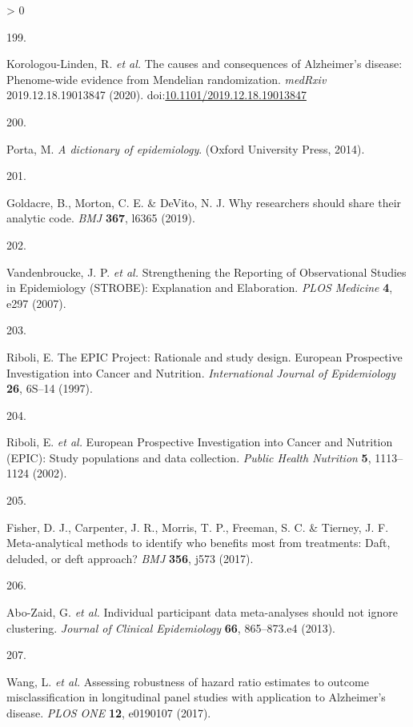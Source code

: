 \documentclass[a4paper, twoside]{templates/ociamthesis}
\newlength{\cslhangindent}
\newlength{\csllabelwidth}
\newenvironment{CSLReferences}[3] %
 {%
  \setlength{\parindent}{0pt}
  \ifodd #1 \everypar{\setlength{\hangindent}{\cslhangindent}}\ignorespaces\fi
  \ifnum #2 > 0
  \setlength{\parskip}{#2\baselineskip}
  \fi
 }%
 {}
\newcommand{\CSLLeftMargin}[1]{\parbox[t]{\maxof{\widthof{#1}}{\csllabelwidth}}{#1}}
\newcommand{\CSLRightInline}[1]{\parbox[t]{\linewidth - \csllabelwidth}{#1}}
\begin{document}
\begin{CSLReferences}{0}{0}
\leavevmode\hypertarget{ref-korologou-linden2020}{}%
\CSLLeftMargin{199. }
\CSLRightInline{Korologou-Linden, R. \emph{et al.} The causes and consequences of {Alzheimer}'s disease: Phenome-wide evidence from {Mendelian} randomization. \emph{medRxiv} 2019.12.18.19013847 (2020). doi:\href{https://doi.org/10.1101/2019.12.18.19013847}{10.1101/2019.12.18.19013847}}

\leavevmode\hypertarget{ref-porta2014dictionary}{}%
\CSLLeftMargin{200. }
\CSLRightInline{Porta, M. \emph{A dictionary of epidemiology}. ({Oxford University Press}, 2014).}

\leavevmode\hypertarget{ref-goldacre2019c}{}%
\CSLLeftMargin{201. }
\CSLRightInline{Goldacre, B., Morton, C. E. \& DeVito, N. J. Why researchers should share their analytic code. \emph{BMJ} \textbf{367}, l6365 (2019).}

\leavevmode\hypertarget{ref-vandenbroucke2007}{}%
\CSLLeftMargin{202. }
\CSLRightInline{Vandenbroucke, J. P. \emph{et al.} Strengthening the {Reporting} of {Observational Studies} in {Epidemiology} ({STROBE}): {Explanation} and {Elaboration}. \emph{PLOS Medicine} \textbf{4}, e297 (2007).}

\leavevmode\hypertarget{ref-riboli1997}{}%
\CSLLeftMargin{203. }
\CSLRightInline{Riboli, E. The {EPIC Project}: Rationale and study design. {European Prospective Investigation} into {Cancer} and {Nutrition}. \emph{International Journal of Epidemiology} \textbf{26}, 6S--14 (1997).}

\leavevmode\hypertarget{ref-riboli2002}{}%
\CSLLeftMargin{204. }
\CSLRightInline{Riboli, E. \emph{et al.} European {Prospective Investigation} into {Cancer} and {Nutrition} ({EPIC}): Study populations and data collection. \emph{Public Health Nutrition} \textbf{5}, 1113--1124 (2002).}

\leavevmode\hypertarget{ref-fisher2017}{}%
\CSLLeftMargin{205. }
\CSLRightInline{Fisher, D. J., Carpenter, J. R., Morris, T. P., Freeman, S. C. \& Tierney, J. F. Meta-analytical methods to identify who benefits most from treatments: Daft, deluded, or deft approach? \emph{BMJ} \textbf{356}, j573 (2017).}

\leavevmode\hypertarget{ref-abo-zaid2013}{}%
\CSLLeftMargin{206. }
\CSLRightInline{Abo-Zaid, G. \emph{et al.} Individual participant data meta-analyses should not ignore clustering. \emph{Journal of Clinical Epidemiology} \textbf{66}, 865--873.e4 (2013).}

\leavevmode\hypertarget{ref-wang2017}{}%
\CSLLeftMargin{207. }
\CSLRightInline{Wang, L. \emph{et al.} Assessing robustness of hazard ratio estimates to outcome misclassification in longitudinal panel studies with application to {Alzheimer}'s disease. \emph{PLOS ONE} \textbf{12}, e0190107 (2017).}


\end{CSLReferences}
\end{document}
